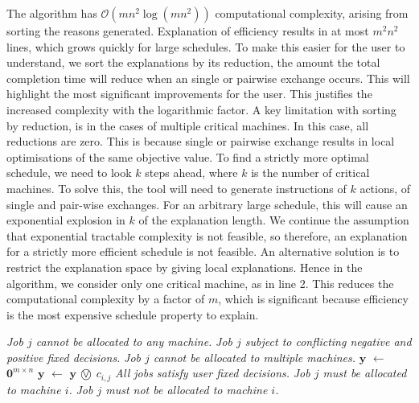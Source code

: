 The algorithm has $\mathcal{O}(mn^2\log(mn^2))$ computational complexity, arising from sorting the reasons generated. Explanation of efficiency results in at most $m^2n^2$ lines, which  grows quickly for large schedules. To make this easier for the user to understand, we sort the explanations by its reduction, the amount the total completion time will reduce when an  single or pairwise exchange occurs. This will highlight the most significant improvements for the user. This justifies the increased complexity with the logarithmic factor.
\linespace
A key limitation with sorting by reduction, is in the cases of multiple critical machines. In this case, all reductions are zero. This is because single or pairwise exchange results in local optimisations of the same objective value. To find a strictly more optimal schedule, we need to look $k$ steps ahead, where $k$ is the number of critical machines. To solve this, the tool will need to generate instructions of $k$ actions, of single and pair-wise exchanges. For an arbitrary large schedule, this will cause an exponential explosion in $k$ of the explanation length. We continue the assumption that exponential tractable complexity is not feasible, so therefore, an explanation for a strictly more efficient schedule is not feasible.
\linespace
An alternative solution is to restrict the explanation space by giving local explanations. Hence in the algorithm, we consider only one critical machine, as in line 2. This reduces the computational complexity by a factor of $m$, which is significant because efficiency is the most expensive schedule property to explain.

\begin{algorithm}[H]
	\caption{}
	\begin{algorithmic}[1]
					\State\emph{Job $j$ cannot be allocated to any machine.}
				\EndIf
					\State\emph{Job $j$ subject to conflicting negative and positive fixed decisions.}
				\EndIf
					\State\emph{Job $j$ cannot be allocated to multiple machines.}	
				\EndIf
			\EndFor
			\State $\mathbf{y}$ $\gets$ $\mathbf{0}^{m\times n}$
					\State $\mathbf{y}$ $\gets$ $\mathbf{y}$ $\incircbin{\lor}$ $c_{i,j}$
				\EndFor
			\EndFor
				\State\emph{All jobs satisfy user fixed decisions.}
			\Else
						\State\emph{Job $j$ must be allocated to machine $i$.}
					\EndIf
						\State\emph{Job $j$ must not be allocated to machine $i$.}
					\EndIf			
				\EndFor
			\EndIf
		\EndFunction
	\end{algorithmic}
\end{algorithm}

